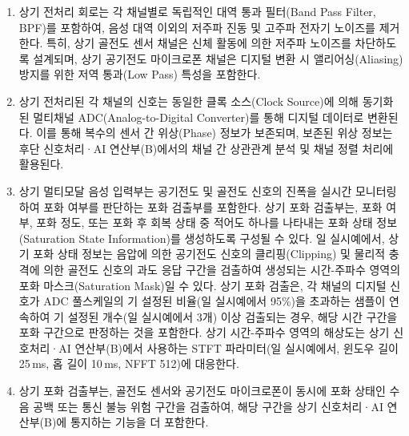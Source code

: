 \documentclass{article}
\DeclareRobustCommand{\vtwoedit}[1]{\textcolor{customgreen}{#1}}
\begin{document}
\begin{enumerate}[label = \textbf{(A.2.\arabic*)}]

    \item 상기 전처리 회로는 각 채널별로 독립적인 대역 통과 필터(Band Pass Filter, BPF)를 포함하여, 음성 대역 이외의 저주파 진동 및 고주파 전자기 노이즈를 제거한다. 
    특히, 상기 골전도 센서 채널은 신체 활동에 의한 저주파 노이즈를 차단하도록 설계되며, 상기 공기전도 마이크로폰 채널은 디지털 변환 시 앨리어싱(Aliasing) 방지를 위한 저역 통과(Low Pass) 특성을 포함한다.

    \item 상기 전처리된 각 채널의 신호는 동일한 클록 소스(Clock Source)에 의해 동기화된 멀티채널 ADC(Analog-to-Digital Converter)를 통해 디지털 데이터로 변환된다. 
    이를 통해 복수의 센서 간 위상(Phase) 정보가 보존되며, 보존된 위상 정보는 후단 신호처리·AI 연산부(B)에서의 채널 간 상관관계 분석 및 채널 정렬 처리에 활용된다.

    \item \vtwoedit{상기 멀티모달 음성 입력부는 공기전도 및 골전도 신호의 진폭을 실시간 모니터링하여 포화 여부를 판단하는 포화 검출부를 포함한다. 상기 포화 검출부는, 포화 여부, 포화 정도, 또는 포화 후 회복 상태 중 적어도 하나를 나타내는 포화 상태 정보(Saturation State Information)를 생성하도록 구성될 수 있다. 일 실시예에서, 상기 포화 상태 정보는 음압에 의한 공기전도 신호의 클리핑(Clipping) 및 물리적 충격에 의한 골전도 신호의 과도 응답 구간을 검출하여 생성되는 시간-주파수 영역의 포화 마스크(Saturation Mask)일 수 있다. 상기 포화 검출은, 각 채널의 디지털 신호가 ADC 풀스케일의 기 설정된 비율(일 실시예에서 95\%)을 초과하는 샘플이 연속하여 기 설정된 개수(일 실시예에서 3개) 이상 검출되는 경우, 해당 시간 구간을 포화 구간으로 판정하는 것을 포함한다. 상기 시간-주파수 영역의 해상도는 상기 신호처리·AI 연산부(B)에서 사용하는 STFT 파라미터(일 실시예에서, 윈도우 길이 25\,ms, 홉 길이 10\,ms, NFFT 512)에 대응한다.}

    \item 상기 포화 검출부는, 골전도 센서와 공기전도 마이크로폰이 동시에 포화 상태인 수음 공백 또는 통신 불능 위험 구간을 검출하여, 해당 구간을 상기 신호처리·AI 연산부(B)에 통지하는 기능을 더 포함한다.


\end{enumerate}
\end{document}
